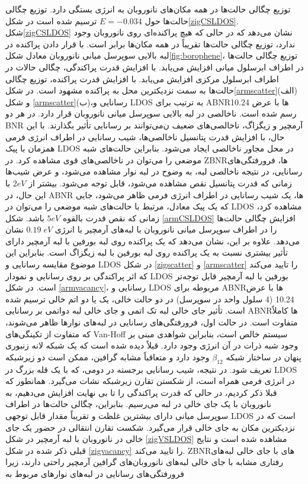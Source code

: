 توزیع چگالی حالت‌ها در همه مکان‌های نانوروبان به انرژی بستگی دارد. توزیع چگالی حالت‌ها حول $E=-0.034$ ترسیم شده است در شکل\ref{zigCSLDOS}. شکل\ref{zigCSLDOS} نشان ‌‌می‌‌دهد که در حالی که هیچ پراکنده‌ای روی نانوروبان وجود ندارد، توزیع چگالی حالت‌ها تقریباً در همه مکان‌ها برابر است. با قرار دادن پراکنده در لبه بالایی سوپرسل ‌میانی نانوروبان معادل شکل\ref{fig:borophene}، توزیع چگالی حالت‌ها در اطراف ابرسلول ‌میانی افزایش ‌‌می‌‌یابد. با افزایش قدرت پراکندگی، چگالی حالات در اطراف ابرسلول مرکزی افزایش ‌‌می‌‌یابد. با افزایش قدرت پراکنده، توزیع چگالی حالت‌ها به سمت نزدیکترین محل به پراکنده مشهود است. در شکل\ref{armscatter}(الف) و شکل \ref{armscatter}(ب)،رسانایی و \gls{LDOS} به ترتیب برای \gls{ABNR}ها با عرض \lr{\AA} 10.24 رسم شده است. ناخالصی در لبه بالایی سوپرسل ‌میانی نانوروبان قرار دارد. در هر دو \gls{BNR} آرمچیر و زیگزاگ، ناخالصی‌های ضعیف ن‌‌می‌‌توانند بر رسانایی تأثیر بگذارند. با این حال، با افزایش قدرت پتانسیل ناخالصی‌ها، شیب رسانایی در اطراف انرژی فر‌‌می‌‌ همزمان با پیک \gls{LDOS} در محل مجاور ناخالصی ایجاد ‌‌می‌‌شود. بنابراین حالت‌های شبه موضعی را ‌‌می‌‌توان در ناخالصی‌های قوی مشاهده کرد. در \gls{ZBNR}ها، فرورفتگی‌های رسانایی، در نتیجه ناخالصی لبه، به وضوح در لبه نوار مشاهده ‌‌می‌‌شود، و عرض شیب‌ها زمانی که قدرت پتانسیل نقص مشاهده ‌‌می‌‌شود، قابل توجه ‌‌می‌‌شود. بیشتر از $2 eV$ با این حال، در \gls{ABNR} ها، یک شیب رسانایی در اطراف انرژی فر‌‌می‌‌ ظاهر ‌‌می‌‌شود، جایی که یک پیک معادل، مرتبط با حالت‌های شبه موضعی را ‌‌می‌‌توان در LDOS مشاهده کرد، زمانی که نقص قدرت بالقوه $5 eV$ باشد. شکل \ref{armCSLDOS} افزایش چگالی حالت‌ها را در اطراف سوپرسل ‌میانی نانوروبان با لبه‌های آرمچیر با انرژی $0.19\; eV$ نشان ‌‌می‌‌دهد. علاوه بر این، نشان ‌‌می‌‌دهد که یک پراکنده روی لبه ‌بورفین با لبه آرمچیر دارای تأثیر بیشتری نسبت به یک پراکنده روی لبه ‌بورفین با لبه زیگزاگ است. بنابراین این موضوع مقایسه رسانایی و \gls{LDOS} در شکل \ref{zigscatter} و \ref{armscatter} را تایید ‌‌می‌‌کند که اثر پراکندگی بر روی رسانایی و نمودار \gls{LDOS} ‌بورفین با لبه آرمچیر قابل توجه‌تر است. در شکل \ref{armvacancy}، رسانایی و \gls{LDOS} مربوطه برای \gls{ABNR}ها با عرض \lr{\AA} 10.24 (4 سلول واحد در سوپرسل) در دو حالت خالی، یک یا دو اتم خالی ترسیم شده است. تأثیر جای خالی لبه تک  اتمی‌‌ و جای خالی لبه دواتمی‌‌ بر رسانایی \gls{ABNR}ها کاملاً متفاوت است. در حالت اول، فرورفتگی‌های رسانایی در لبه‌های نوارها ظاهر ‌می‌شوند، که متفاوت از تکینگی‌های \gls{Van-Hoff} سیستم خالص است، بنابراین شواهدی مبنی بر وجود شبه ذرات در آن انرژی وجود دارد. قبلاً دیده شده است که یک شبکه لانه زنبوری پنهان در ساختار شبکه $\beta_{12}$ وجود دارد و متعاقباً مشابه گرافین، ممکن است دو زیرشبکه تعریف شود. در نتیجه، شیب رسانایی برجسته در دو‌می‌، که با یک قله بزرگ در \gls{LDOS} در انرژی فر‌‌می‌‌ همراه است، از شکستن تقارن زیرشبکه نشات ‌می‌گیرد. همانطور که قبلا ذکر کردیم، در حالی که قدرت پراکندگی را تا بی نهایت افزایش ‌‌می‌‌دهیم، به نانوروبان با یک جای خالی در لبه ‌‌می‌‌رسیم. بنابراین، چگالی حالت‌ها در اطراف سوپرسل ‌میانی دارای بیشترین غلظت و تقریباً مقدار قابل توجهی \gls{LDOS} است که در نزدیکترین مکان به جای خالی قرار ‌می‌گیرد. شکست تقارن انتقالی در حضور یک جای خالی در نانوروبان با لبه آرمچیر در شکل \ref{zigVSLDOS} مشاهده شده است و نتایج قبلی ذکر شده در شکل \ref{zigvacancy} را تایید ‌‌می‌‌کند. \gls{ZBNR}های با جای خالی لبه‌های رفتاری مشابه با جای خالی لبه‌های نانوروبان‌های گرافین آرمچیر راحتی دارند، زیرا فرورفتگی‌های رسانایی در لبه‌های نوارهای مربوط به 